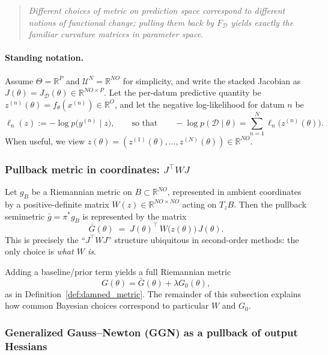 \begin{quote}
\emph{Different choices of metric on prediction space correspond to different notions of functional
change; pulling them back by $F_{\mathcal D}$ yields exactly the familiar curvature matrices in parameter
space.}
\end{quote}

\paragraph{Standing notation.}
Assume $\Theta=\mathbb R^P$ and $\mathcal U^N=\mathbb R^{NO}$ for simplicity, and write the stacked Jacobian
as $J(\theta)=J_{\mathcal D}(\theta)\in\mathbb R^{NO\times P}$.  Let the per-datum predictive quantity be
$z^{(n)}(\theta)=f_\theta(x^{(n)})\in\mathbb R^O$, and let the negative log-likelihood for datum $n$ be
\[
\ell_n(z):=-\log p\bigl(y^{(n)}\mid z\bigr),
\qquad
\text{so that}\qquad
-\log p(\mathcal D\mid\theta)=\sum_{n=1}^N \ell_n\bigl(z^{(n)}(\theta)\bigr).
\]
When useful, we view $z(\theta)=(z^{(1)}(\theta),\dots,z^{(N)}(\theta))\in\mathbb R^{NO}$.

\subsubsection{Pullback metric in coordinates: $J^\top W J$}

Let $g_B$ be a Riemannian metric on $B\subset\mathbb R^{NO}$, represented in ambient coordinates by a
positive-definite matrix $W(z)\in\mathbb R^{NO\times NO}$ acting on $T_zB$.
Then the pullback semimetric $\bar g=\pi^\ast g_B$ is represented by the matrix
\begin{equation}
\bar G(\theta)
\;=\;
J(\theta)^\top\,W\bigl(z(\theta)\bigr)\,J(\theta).
\label{eq:pullback_W_form}
\end{equation}
This is precisely the ``$J^\top W J$'' structure ubiquitous in second-order methods: the only choice is
\emph{what $W$ is}.

Adding a baseline/prior term yields a full Riemannian metric
\[
G(\theta)=\bar G(\theta)+\lambda G_0(\theta),
\]
as in Definition~\ref{def:damped_metric}.  The remainder of this subsection explains how common Bayesian
choices correspond to particular $W$ and $G_0$.

\subsubsection{Generalized Gauss--Newton (GGN) as a pullback of output Hessians}

